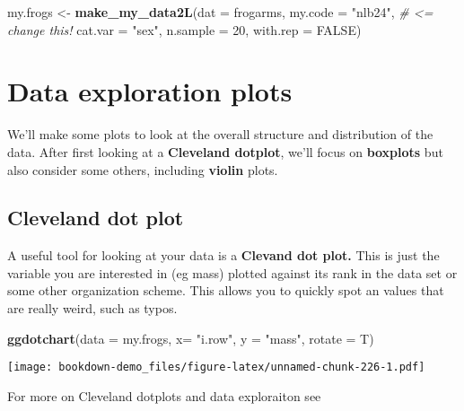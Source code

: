 \documentclass[]{book}
\newenvironment{Shaded}{\begin{snugshade}}{\end{snugshade}}
\newcommand{\KeywordTok}[1]{\textcolor[rgb]{0.13,0.29,0.53}{\textbf{#1}}}
\newcommand{\DataTypeTok}[1]{\textcolor[rgb]{0.13,0.29,0.53}{#1}}
\newcommand{\DecValTok}[1]{\textcolor[rgb]{0.00,0.00,0.81}{#1}}
\newcommand{\StringTok}[1]{\textcolor[rgb]{0.31,0.60,0.02}{#1}}
\newcommand{\CommentTok}[1]{\textcolor[rgb]{0.56,0.35,0.01}{\textit{#1}}}
\newcommand{\OtherTok}[1]{\textcolor[rgb]{0.56,0.35,0.01}{#1}}
\newcommand{\NormalTok}[1]{#1}
\theoremstyle{definition}
\theoremstyle{definition}
\theoremstyle{definition}
\theoremstyle{remark}
\begin{document}
\begin{Shaded}
\begin{Highlighting}[]
\NormalTok{my.frogs <-}\StringTok{ }\KeywordTok{make_my_data2L}\NormalTok{(}\DataTypeTok{dat =}\NormalTok{ frogarms, }
                           \DataTypeTok{my.code =} \StringTok{"nlb24"}\NormalTok{, }\CommentTok{# <=  change this!}
                           \DataTypeTok{cat.var =} \StringTok{"sex"}\NormalTok{,}
                           \DataTypeTok{n.sample =} \DecValTok{20}\NormalTok{, }
                           \DataTypeTok{with.rep =} \OtherTok{FALSE}\NormalTok{)}
\end{Highlighting}
\end{Shaded}

\section{Data exploration plots}\label{data-exploration-plots}

We'll make some plots to look at the overall structure and distribution
of the data. After first looking at a \textbf{Cleveland dotplot}, we'll
focus on \textbf{boxplots} but also consider some others, including
\textbf{violin} plots.

\subsection{Cleveland dot plot}\label{cleveland-dot-plot}

A useful tool for looking at your data is a \textbf{Clevand dot plot.}
This is just the variable you are interested in (eg mass) plotted
against its rank in the data set or some other organization scheme. This
allows you to quickly spot an values that are really weird, such as
typos.

\begin{Shaded}
\begin{Highlighting}[]
\KeywordTok{ggdotchart}\NormalTok{(}\DataTypeTok{data =}\NormalTok{ my.frogs, }
           \DataTypeTok{x=} \StringTok{"i.row"}\NormalTok{, }
           \DataTypeTok{y =} \StringTok{"mass"}\NormalTok{, }
           \DataTypeTok{rotate =}\NormalTok{ T)}
\end{Highlighting}
\end{Shaded}

\texttt{[image: bookdown-demo\_files/figure-latex/unnamed-chunk-226-1.pdf]}

For more on Cleveland dotplots and data exploraiton see
\end{document}
